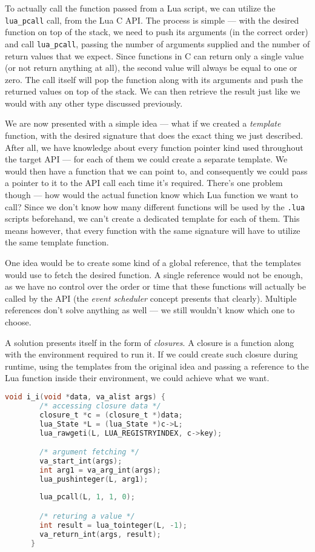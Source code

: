 \documentclass[polish, english]{iithesis}
\begin{document}
    To actually call the function passed from a Lua script, we can utilize the \texttt{lua\_pcall} call, from the Lua C API.
    The process is simple --- with the desired function on top of the stack, we need to push its arguments (in the correct order) and call \texttt{lua\_pcall}, passing the number of arguments supplied and the number of return values that we expect.
    Since functions in C can return only a single value (or not return anything at all), the second value will always be equal to one or zero.
    The call itself will pop the function along with its arguments and push the returned values on top of the stack.
    We can then retrieve the result just like we would with any other type discussed previously.

    We are now presented with a simple idea --- what if we created a \textit{template} function, with the desired signature that does the exact thing we just described.
    After all, we have knowledge about every function pointer kind used throughout the target API --- for each of them we could create a separate template.
    We would then have a function that we can point to, and consequently we could pass a pointer to it to the API call each time it's required.
    There's one problem though --- how would the actual function know which Lua function we want to call?
    Since we don't know how many different functions will be used by the \texttt{.lua} scripts beforehand, we can't create a dedicated template for each of them.
    This means however, that every function with the same signature will have to utilize the same template function.

    One idea would be to create some kind of a global reference, that the templates would use to fetch the desired function.
    A single reference would not be enough, as we have no control over the order or time that these functions will actually be called by the API (the \textit{event scheduler} concept presents that clearly).
    Multiple references don't solve anything as well --- we still wouldn't know which one to choose.

    A solution presents itself in the form of \textit{closures}.
    A closure is a function along with the environment required to run it.
    If we could create such closure during runtime, using the templates from the original idea and passing a reference to the Lua function inside their environment, we could achieve what we want.
    \begin{lstlisting}[language=c, caption=Example of a generated template function for an \texttt{int (*)(int)} callback]
      void i_i(void *data, va_alist args) {
        /* accessing closure data */
        closure_t *c = (closure_t *)data;
        lua_State *L = (lua_State *)c->L;
        lua_rawgeti(L, LUA_REGISTRYINDEX, c->key);

        /* argument fetching */
        va_start_int(args);
        int arg1 = va_arg_int(args);
        lua_pushinteger(L, arg1);
        
        lua_pcall(L, 1, 1, 0);

        /* returing a value */
        int result = lua_tointeger(L, -1);
        va_return_int(args, result);
      }
    \end{lstlisting}
\end{document}
